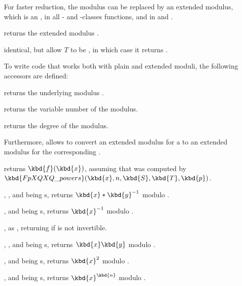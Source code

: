 
For faster reduction, the modulus  can be replaced by an extended
modulus, which is an , in all - and -classes
functions, and in  and .

 returns the extended modulus
.

 identical, but allow $T$ to
be , in which case it returns .

To write code that works both with plain and extended moduli, the following
accessors are defined:

 returns the underlying modulus .

 returns the variable number of the modulus.

 returns the degree of the modulus.

Furthermore,  allows to convert an extended modulus for
a  to an extended modulus for the corresponding .


 returns
$\kbd{f}(\kbd{x})$, assuming that  was computed by
$\kbd{FpXQXQ\_powers}(\kbd{x}, n, \kbd{S}, \kbd{T}, \kbd{p})$.

, ,  and
 being s, returns $\kbd{x}*\kbd{y}^{-1}$ modulo .

,  and
 being s, returns $\kbd{x}^{-1}$ modulo .

, as ,
returning  if  is not invertible.

, ,  and
 being s, returns $\kbd{x}\*\kbd{y}$ modulo .

,  and
 being s, returns $\kbd{x}^2$ modulo .

,  and
 being s, returns $\kbd{x}^\kbd{n}$ modulo .


